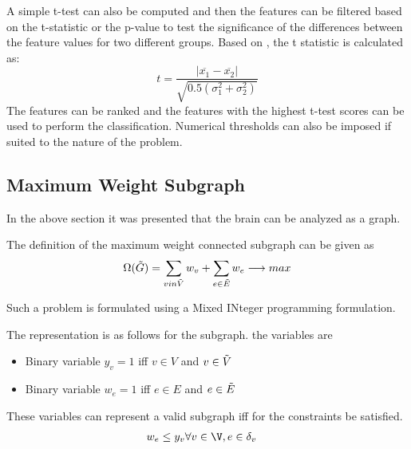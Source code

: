 \documentclass[msthesis.tex]{subfiles}
\begin{document}
A simple t-test can also be computed and then the features can be filtered based on the t-statistic or the p-value to test the significance of the differences between the feature values for two different groups. Based on \cite{inza2004filter}, the t statistic is calculated as:
\begin{equation}
    t = \frac{|\overline{x_1} - \overline{x_2}|}{\sqrt{0.5(\sigma_{1}^2 + \sigma_{2}^2)}}
\end{equation}
The features can be ranked and the features with the highest t-test scores can be used to perform the classification. Numerical thresholds can also be imposed if suited to the nature of the problem. 
\subsection{Maximum Weight Subgraph}
In the above section it was presented that the brain can be analyzed as a graph. 

The definition of the maximum weight connected subgraph can be given as 
\begin{equation}
    \Omega(\Tilde{G}) = \sum_{v in \Tilde{V}} w_v + \sum_{e \in \Tilde{E}} w_e \longrightarrow max
\end{equation}

Such a problem is formulated using a Mixed INteger programming formulation. 

The representation is as follows for the subgraph. the variables are
\begin{itemize}
    \item Binary variable $y_v = 1$ iff $v \in V$ and $v \in \Tilde{V}$
    \item Binary variable $w_e =1 $ iff $e \in E$ and $e \in \Tilde{E}$
\end{itemize}
These variables can represent a valid subgraph iff for the constraints be satisfied. 
\begin{align*}
    w_e \leq y_v & \forall v \in \V, e \in \delta_{v}
\end{align*}
\end{document}
